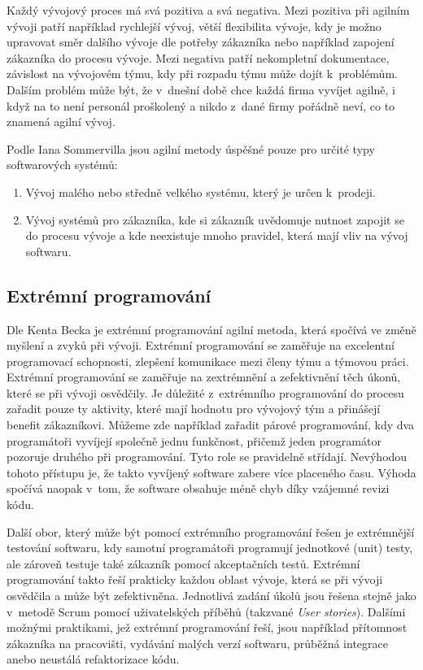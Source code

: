 \documentclass[czech,master]{diploma}
\begin{document}
Každý vývojový proces má svá pozitiva a svá negativa. Mezi pozitiva při agilním vývoji patří například rychlejší vývoj, větší flexibilita vývoje, kdy je možno upravovat směr dalšího vývoje dle potřeby zákazníka nebo například zapojení zákazníka do procesu vývoje. Mezi negativa patří nekompletní dokumentace, závislost na vývojovém týmu, kdy při rozpadu týmu může dojít k~problémům. Dalším problém může být, že v~dnešní době chce každá firma vyvíjet agilně, i když na to není personál proškolený a nikdo z~dané firmy pořádně neví, co to znamená agilní vývoj.

Podle Iana Sommervilla \cite{ref:sommerrville_agile_products} jsou agilní metody úspěšné pouze pro určité typy softwarových systémů:

\begin{enumerate}
\item Vývoj malého nebo středně velkého systému, který je určen k~prodeji.
\item Vývoj systémů pro zákazníka, kde si zákazník uvědomuje nutnost zapojit se do procesu vývoje a kde neexistuje mnoho pravidel, která mají vliv na vývoj softwaru.
\end{enumerate}


\subsection{Extrémní programování}
Dle Kenta Becka \cite{ref:what_is_xp} je extrémní programování agilní metoda, která spočívá ve změně myšlení a zvyků při vývoji. Extrémní programování se zaměřuje na excelentní programovací schopnosti, zlepšení komunikace mezi členy týmu a týmovou práci. Extrémní programování se zaměřuje na zextrémnění a zefektivnění těch úkonů, které se při vývoji osvědčily. Je důležité z~extrémního programování do procesu zařadit pouze ty aktivity, které mají hodnotu pro vývojový tým a přinášejí benefit zákazníkovi. Můžeme zde například zařadit párové programování, kdy dva programátoři vyvíjejí společně jednu funkčnost, přičemž jeden programátor pozoruje druhého při programování. Tyto role se pravidelně střídají. Nevýhodou tohoto přístupu je, že takto vyvíjený software zabere více placeného času. Výhoda spočívá naopak v~tom, že software obsahuje méně chyb díky vzájemné revizi kódu.

Další obor, který může být pomocí extrémního programování řešen je extrémnější testování softwaru, kdy samotní programátoři programují jednotkové (unit) testy, ale zároveň testuje také zákazník pomocí akceptačních testů. Extrémní programování takto řeší prakticky každou oblast vývoje, která se při vývoji osvědčila a může být zefektivněna. Jednotlivá zadání úkolů jsou řešena stejně jako v~metodě Scrum pomocí uživatelských příběhů (takzvané \textit{User stories}). Dalšími možnými praktikami, jež extrémní programování řeší, jsou například přítomnost zákazníka na pracovišti, vydávání malých verzí softwaru, průběžná integrace anebo neustálá refaktorizace kódu.
\end{document}
